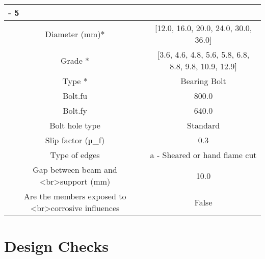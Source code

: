 \documentclass{article}%
\begin{document}
\begin{longtable}{|p{5cm}|p{2cm}|p{2cm}|p{2cm}|p{5cm}|}
{-%
5}%
\hline%
\multicolumn{5}{|c|}{\textbf{Bolt Details}}\\%
\hline%
\hline%
\multicolumn{3}{|c|}{Diameter (mm)*}&\multicolumn{2}{|c|}{{[}12.0, 16.0, 20.0, 24.0, 30.0, 36.0{]}}\\%
\hline%
\hline%
\multicolumn{3}{|c|}{Grade *}&\multicolumn{2}{|c|}{{[}3.6, 4.6, 4.8, 5.6, 5.8, 6.8, 8.8, 9.8, 10.9, 12.9{]}}\\%
\hline%
\hline%
\multicolumn{3}{|c|}{Type *}&\multicolumn{2}{|c|}{Bearing Bolt}\\%
\hline%
\hline%
\multicolumn{3}{|c|}{Bolt.fu}&\multicolumn{2}{|c|}{800.0}\\%
\hline%
\hline%
\multicolumn{3}{|c|}{Bolt.fy}&\multicolumn{2}{|c|}{640.0}\\%
\hline%
\hline%
\multicolumn{3}{|c|}{Bolt hole type}&\multicolumn{2}{|c|}{Standard}\\%
\hline%
\hline%
\multicolumn{3}{|c|}{Slip factor (µ\_f)}&\multicolumn{2}{|c|}{0.3}\\%
\hline%
\hline%
\multicolumn{3}{|c|}{Type of edges}&\multicolumn{2}{|c|}{a {-} Sheared or hand flame cut}\\%
\hline%
\hline%
\multicolumn{3}{|c|}{Gap between beam and <br>support (mm)}&\multicolumn{2}{|c|}{10.0}\\%
\hline%
\hline%
\multicolumn{3}{|c|}{Are the members exposed to <br>corrosive influences}&\multicolumn{2}{|c|}{False}\\%
\hline%
\end{longtable}

%
%
\newpage%
\section{Design Checks}%
\label{sec:DesignChecks}%
\end{document}
